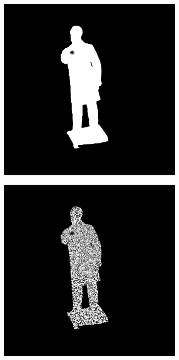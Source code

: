 \documentclass[border=15pt, multi, tikz]{article}
\begin{document}
\begin{figure}[H]
	\begin{subfigure}[b]{0.20\linewidth}
		\includegraphics[width=\linewidth]{./Figures/test_scenes/05111.depth0.png}
	\end{subfigure}
	\begin{subfigure}[b]{0.20\linewidth}
		\includegraphics[width=\linewidth]{./Figures/test_scenes/05111.depth0_noise.png}

\end{subfigure}
\end{figure}
\end{document}
